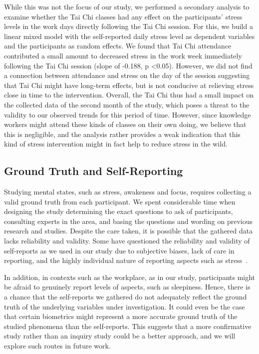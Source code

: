 While this was not the focus of our study, we performed a secondary analysis to examine whether the Tai Chi classes had any effect on the participants' stress levels in the work days directly following the Tai Chi session. For this, we build a linear mixed model with the self-reported daily stress level as dependent variables and the participants as random effects. We found that Tai Chi attendance contributed a small amount to decreased stress in the work week immediately following the Tai Chi session (slope of -0.188, p <0.05). However, we did not find a connection between attendance and stress on the day of the session suggesting that Tai Chi might have long-term effects, but is not conducive at relieving stress close in time to the intervention. Overall, the Tai Chi thus had a small impact on the collected data of the second month of the study, which poses a threat to the validity to our observed trends for this period of time. However, since knowledge workers might attend these kinds of classes on their own doing, we believe that this is negligible, and the analysis rather provides a weak indication that this kind of stress intervention might in fact help to reduce stress in the wild.

\subsection{Ground Truth and Self-Reporting}
Studying mental states, such as stress, awakeness and focus,
requires collecting a valid ground truth from each participant.
We spent considerable time when designing the study
 determining the exact questions to ask of participants,
consulting experts in the area, and basing
the questions and wording on previous research and studies. 
Despite the care taken, it is possible that the 
gathered data lacks reliability and validity. Some have
questioned the
reliability and validity of self-reports as we used in our study
due to subjective biases, lack of care in reporting, and the
highly individual nature of reporting aspects such as
stress~\cite{Hernandez11,Hovsepian15}. 

In addition, in contexts such
as the workplace, as in our study,
participants  might be afraid to genuinely report levels
of aspects, such as sleepiness. Hence, there is a chance that the
self-reports we gathered  do not adequately reflect the ground
truth of the underlying variables under investigation. It could even be
the case that certain biometrics might represent a more accurate
ground truth of the studied phenomena than the self-reports. This
suggests that a more confirmative study rather than an inquiry study
could be a better approach, and we will explore such routes in future
work.

